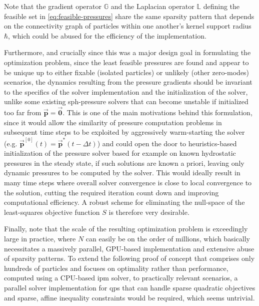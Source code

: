 \documentclass[conference]{IEEEtran}
\newcommand\vek[1]{\vec{\bm{#1}}}
\newcommand\mat[1]{{\mathds{#1}}}
\begin{document}
Note that the gradient operator $\mat{G}$ and the Laplacian operator $\mat{L}$ defining the feasible set in \autoref{eq:feasible-pressures} share the same sparsity pattern that depends on the connectivity graph of particles within one another's kernel support radius $\hbar$, which could be abused for the efficiency of the implementation. 


Furthermore, and crucially since this was a major design goal in formulating the optimization problem, since the least feasible pressures are found and appear to be unique up to either fixable (isolated particles) or unlikely (other zero-modes) scenarios, the dynamics resulting from the pressure gradients should be invariant to the specifics of the solver implementation and the initialization of the solver, unlike some existing \ac{sph}-pressure solvers that can become unstable if initialized too far from $\vek{p}=\vek{0}$. This is one of the main motivations behind this formulation, since it would allow the similarity of pressure computation problems in subsequent time steps to be exploited by aggressively warm-starting the solver (e.g. $\vek{p}^{[0]}(t) = \vek{p}^*(t-\Delta t)$) and could open the door to heuristics-based initialization of the pressure solver based for example on known hydrostatic pressures in the steady state, if such solutions are known a priori, leaving only dynamic pressures to be computed by the solver. This would ideally result in many time steps where overall solver convergence is close to local convergence to the solution, cutting the required iteration count down and improving computational efficiency. A robust scheme for eliminating the null-space of the least-squares objective function $S$ is therefore very desirable.

Finally, note that the scale of the resulting optimization problem is exceedingly large in practice, where $N$ can easily be on the order of millions, which basically necessitates a massively parallel, GPU-based implementation and extensive abuse of sparsity patterns. To extend the following proof of concept that comprises only hundreds of particles and focuses on optimality rather than performance, computed using a CPU-based \ac{ipm} solver, to practically relevant scenarios, a parallel solver implementation for \ac{qps} that can handle sparse quadratic objectives and sparse, affine inequality constraints would be required, which seems untrivial.
\end{document}

